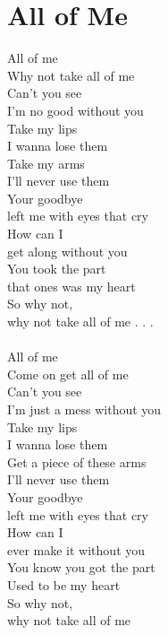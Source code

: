 \section{All of Me}
All of me\\
Why not take all of me\\
Can't you see\\
I'm no good without you\\
Take my lips\\
I wanna lose them\\
Take my arms\\
I'll never use them\\
Your goodbye\\
left me with eyes that cry\\
How can I \\
get along without you\\
You took the part\\
that ones was my heart\\
So why not, \\
why not take all of me . . .\\
\\
All of me\\
Come on get all of me\\
Can't you see\\
I'm just a mess without you\\
Take my lips\\
I wanna lose them\\
Get a piece of these arms\\
I'll never use them\\
Your goodbye \\
left me with eyes that cry\\
How can I \\
ever make it without you\\
You know you got the part\\
Used to be my heart\\
So why not,\\
why not take all of me